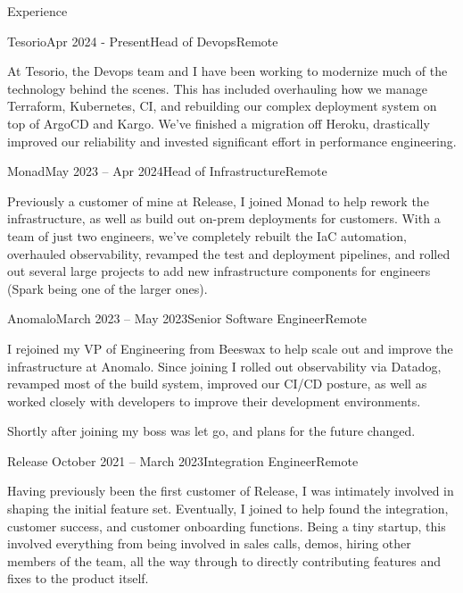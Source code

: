 \documentclass{resume} %
\begin{document}

\begin{rSection}{Experience}

\begin{rSubsection}{Tesorio}{Apr 2024 - Present}{Head of Devops}{Remote}
\item[] At Tesorio, the Devops team and I have been working to modernize much of the technology behind the scenes. This has included overhauling how we manage Terraform, Kubernetes, CI, and rebuilding our complex deployment system on top of ArgoCD and Kargo.  We've finished a migration off Heroku, drastically improved our reliability and invested significant effort in performance engineering.

\end{rSubsection}

\begin{rSubsection}{Monad}{May 2023 -- Apr 2024}{Head of Infrastructure}{Remote}
\item[] Previously a customer of mine at Release, I joined Monad to help rework the infrastructure, as well as build out on-prem deployments for customers.  With a team of just two engineers, we've completely rebuilt the IaC automation, overhauled observability, revamped the test and deployment pipelines, and rolled out several large projects to add new infrastructure components for engineers (Spark being one of the larger ones).
\end{rSubsection}

\begin{rSubsection}{Anomalo}{March 2023 -- May 2023}{Senior Software Engineer}{Remote}
\item[] I rejoined my VP of Engineering from Beeswax to help scale out and improve the infrastructure at Anomalo.  Since joining I rolled out observability via Datadog, revamped most of the build system, improved our CI/CD posture, as well as worked closely with developers to improve their development environments.

Shortly after joining my boss was let go, and plans for the future changed.
\end{rSubsection}

\begin{rSubsection}{Release }{October 2021 -- March 2023}{Integration Engineer}{Remote}
\item[]Having previously been the first customer of Release, I was intimately involved in shaping the initial feature set.  Eventually, I joined to help found the integration, customer success, and customer onboarding functions.  Being a tiny startup, this involved everything from being involved in sales calls, demos, hiring other members of the team, all the way through to directly contributing features and fixes to the product itself.


\end{rSubsection}
\end{rSection}
\end{document}
